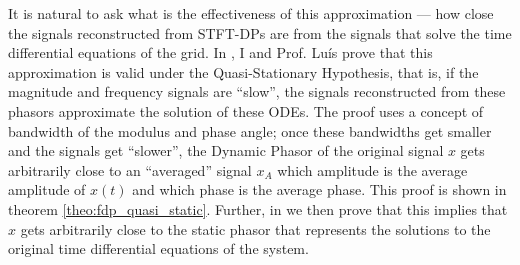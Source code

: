 	It is natural to ask what is the effectiveness of this approximation — how close the signals reconstructed from STFT-DPs are from the signals that solve the time differential equations of the grid. In \cite{volpatoDynamicPhasorTransform2022}, I and Prof. Luís prove that this approximation is valid under the Quasi-Stationary Hypothesis, that is, if the magnitude and frequency signals are ``slow'', the signals reconstructed from these phasors approximate the solution of these ODEs. The proof uses a concept of bandwidth of the modulus and phase angle; once these bandwidths get smaller and the signals get ``slower'', the Dynamic Phasor of the original signal $x$ gets arbitrarily close to an ``averaged'' signal $x_A$ which amplitude is the average amplitude of $x(t)$ and which phase is the average phase. This proof is shown in theorem \ref{theo:fdp_quasi_static}. Further, in \cite{volpatoDynamicPhasorTransform2022} we then prove that this implies that $x$ gets arbitrarily close to the static phasor that represents the solutions to the original time differential equations of the system.

